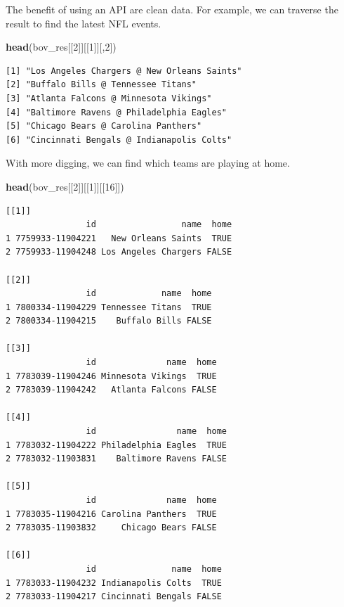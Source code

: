 \documentclass[
]{article}
\newenvironment{Shaded}{\begin{snugshade}}{\end{snugshade}}
\newcommand{\DecValTok}[1]{\textcolor[rgb]{0.00,0.00,0.81}{#1}}
\newcommand{\KeywordTok}[1]{\textcolor[rgb]{0.13,0.29,0.53}{\textbf{#1}}}
\newcommand{\NormalTok}[1]{#1}
\begin{document}
The benefit of using an API are clean data. For example, we can traverse the result to find the latest NFL events.

\begin{Shaded}
\begin{Highlighting}[]
\KeywordTok{head}\NormalTok{(bov_res[[}\DecValTok{2}\NormalTok{]][[}\DecValTok{1}\NormalTok{]][,}\DecValTok{2}\NormalTok{])}
\end{Highlighting}
\end{Shaded}

\begin{verbatim}
[1] "Los Angeles Chargers @ New Orleans Saints"
[2] "Buffalo Bills @ Tennessee Titans"         
[3] "Atlanta Falcons @ Minnesota Vikings"      
[4] "Baltimore Ravens @ Philadelphia Eagles"   
[5] "Chicago Bears @ Carolina Panthers"        
[6] "Cincinnati Bengals @ Indianapolis Colts"  
\end{verbatim}

With more digging, we can find which teams are playing at home.

\begin{Shaded}
\begin{Highlighting}[]
\KeywordTok{head}\NormalTok{(bov_res[[}\DecValTok{2}\NormalTok{]][[}\DecValTok{1}\NormalTok{]][[}\DecValTok{16}\NormalTok{]])}
\end{Highlighting}
\end{Shaded}

\begin{verbatim}
[[1]]
                id                 name  home
1 7759933-11904221   New Orleans Saints  TRUE
2 7759933-11904248 Los Angeles Chargers FALSE

[[2]]
                id             name  home
1 7800334-11904229 Tennessee Titans  TRUE
2 7800334-11904215    Buffalo Bills FALSE

[[3]]
                id              name  home
1 7783039-11904246 Minnesota Vikings  TRUE
2 7783039-11904242   Atlanta Falcons FALSE

[[4]]
                id                name  home
1 7783032-11904222 Philadelphia Eagles  TRUE
2 7783032-11903831    Baltimore Ravens FALSE

[[5]]
                id              name  home
1 7783035-11904216 Carolina Panthers  TRUE
2 7783035-11903832     Chicago Bears FALSE

[[6]]
                id               name  home
1 7783033-11904232 Indianapolis Colts  TRUE
2 7783033-11904217 Cincinnati Bengals FALSE
\end{verbatim}
\end{document}
